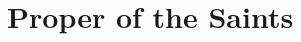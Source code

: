 \clearpage
\chapter{Proper of the Saints}
{
\newcommand{\benedicamusdomino}[1][1]{
  \noindent\printnote{\Vbar~\emph{Benedicámus Dómino}, page \pageref{benedicamusdomino-#1}.}
  \bigskip
  \hrule
}








}
